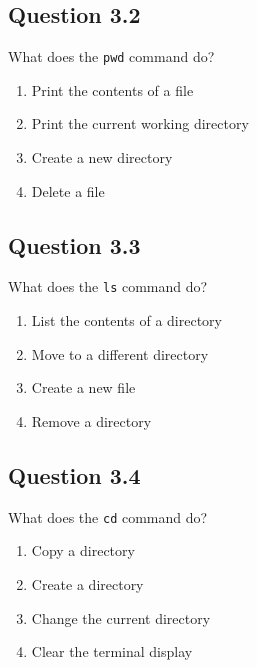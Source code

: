 \documentclass[
  letterpaper,
  DIV=11,
  numbers=noendperiod]{scrreprt}
\providecommand{\tightlist}{%
  \setlength{\itemsep}{0pt}\setlength{\parskip}{0pt}}
\begin{document}
\subsection{Question 3.2}\label{question-3.2}

What does the \texttt{pwd} command do?

\begin{enumerate}
\def\labelenumi{\Alph{enumi})}
\tightlist
\item
  Print the contents of a file\\
\item
  Print the current working directory\\
\item
  Create a new directory\\
\item
  Delete a file
\end{enumerate}

\subsection{Question 3.3}\label{question-3.3}

What does the \texttt{ls} command do?

\begin{enumerate}
\def\labelenumi{\Alph{enumi})}
\tightlist
\item
  List the contents of a directory\\
\item
  Move to a different directory\\
\item
  Create a new file\\
\item
  Remove a directory
\end{enumerate}

\subsection{Question 3.4}\label{question-3.4}

What does the \texttt{cd} command do?

\begin{enumerate}
\def\labelenumi{\Alph{enumi})}
\tightlist
\item
  Copy a directory\\
\item
  Create a directory\\
\item
  Change the current directory\\
\item
  Clear the terminal display
\end{enumerate}
\end{document}
